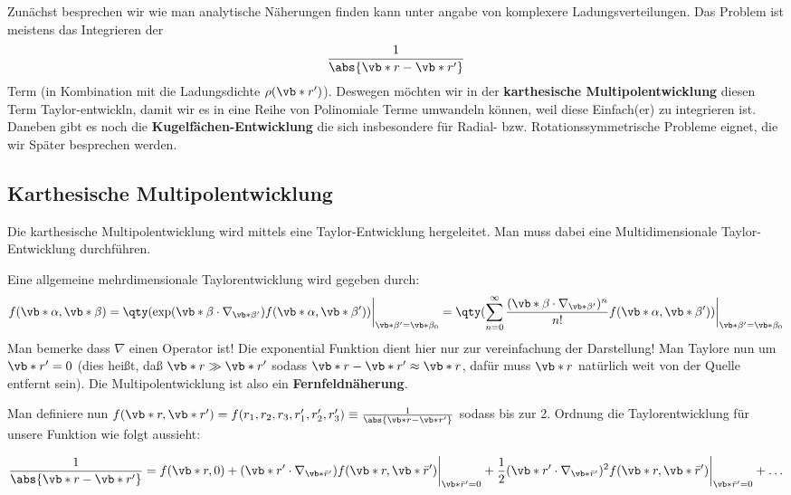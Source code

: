 Zunächst besprechen wir wie man analytische Näherungen finden kann
unter angabe von komplexere Ladungsverteilungen. 
Das Problem ist meistens das Integrieren der
\begin{equation*}
  \frac{1}{\abs{\vb*r-\vb*r'}}
\end{equation*}
Term (in Kombination mit die Ladungsdichte $\rho(\vb*r')$). 
Deswegen möchten wir in der \textbf{karthesische Multipolentwicklung} 
diesen  Term Taylor-entwickln, damit wir es in eine 
Reihe von Polinomiale Terme umwandeln können, 
weil diese Einfach(er) zu integrieren ist. 
Daneben gibt es noch die \textbf{Kugelfächen-Entwicklung} die sich 
insbesondere für Radial- bzw. Rotationssymmetrische Probleme eignet, 
die wir Später besprechen werden. 

\subsection{Karthesische Multipolentwicklung}%
\label{ssub:Karthesische-Multipolentwicklung}
Die karthesische Multipolentwicklung wird mittels eine Taylor-Entwicklung
hergeleitet. Man muss dabei eine Multidimensionale Taylor-Entwicklung 
durchführen.

Eine allgemeine mehrdimensionale Taylorentwicklung wird gegeben durch:
\begin{equation*}
  f(\vb*\alpha, \vb*\beta)
  =\qty(\exp(\vb*\beta\cdot\nabla_{\vb*\beta'})
  f(\vb*\alpha, \vb*\beta'))
  \bigg|_{\vb*\beta'=\vb*\beta_0}
  =\qty(\sum_{n=0}^\infty
  \frac{(\vb*\beta\cdot\nabla_{\vb*\beta'})^n}{n!}
  f(\vb*\alpha, \vb*\beta'))
  \bigg|_{\vb*\beta'=\vb*\beta_0}
\end{equation*}
Man bemerke dass $\nabla$ einen Operator ist! Die exponential Funktion
dient hier nur zur vereinfachung der Darstellung! Man Taylore nun um $\vb*r'=0$ (dies heißt, daß $\vb*r\gg\vb*r'$ sodass 
$\vb*r-\vb*r'\approx\vb*r$, dafür muss $\vb*r$ natürlich weit
von der Quelle entfernt sein). Die Multipolentwicklung ist also ein 
\textbf{Fernfeldnäherung}.

Man definiere nun $f(\vb*r,\vb*r')=f(r_1,r_2,r_3,r_1',r_2',r_3')
\equiv\frac{1}{\abs{\vb*r-\vb*r'}}$ sodass bis zur 2. Ordnung die Taylorentwicklung für unsere Funktion
wie folgt aussieht:

\begin{equation*}
  \frac{1}{\abs{\vb*r-\vb*r'}}=f(\vb*r, 0)
  + (\vb*r'\cdot \nabla_{\vb*{\bar{r}'}}) f(\vb*r, \vb*{\bar{r}}')\bigg|_{\vb*{\bar{r}}'=0}
  + \frac{1}{2}(\vb*r'\cdot\nabla_{\vb*{\bar r'}})^2
  f(\vb*r,\vb*{\bar r}')
  \bigg|_{\vb*{\bar r'}=0}
  + \ldots
\end{equation*}

